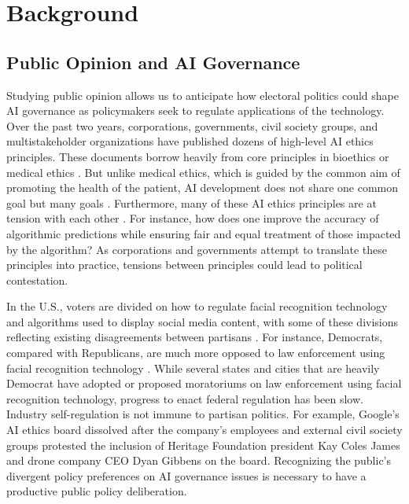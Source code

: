 \documentclass{article}
\begin{document}
\section{Background}

\subsection{Public Opinion and AI Governance}

Studying public opinion allows us to anticipate how electoral politics could shape AI governance as policymakers seek to regulate applications of the technology. Over the past two years, corporations, governments, civil society groups, and multistakeholder organizations have published dozens of high-level AI ethics principles. These documents borrow heavily from core principles in bioethics or medical ethics \citep{floridi2019unified}. But unlike medical ethics, which is guided by the common aim of promoting the health of the patient, AI development does not share one common goal but many goals \citep{mittelstadt2019ai}. Furthermore, many of these AI ethics principles are at tension with each other \citep{whittlestone2019role}. For instance, how does one improve the accuracy of algorithmic predictions while ensuring fair and equal treatment of those impacted by the algorithm? As corporations and governments attempt to translate these principles into practice, tensions between principles could lead to political contestation. 

In the U.S., voters are divided on how to regulate facial recognition technology and algorithms used to display social media content, with some of these divisions reflecting existing disagreements between partisans \citep{zhang2019regulation}. For instance, Democrats, compared with Republicans, are much more opposed to law enforcement using facial recognition technology \citep{smith2019facial}. While several states and cities that are heavily Democrat have adopted or proposed moratoriums on law enforcement using facial recognition technology, progress to enact federal regulation has been slow. Industry self-regulation is not immune to partisan politics. For example, Google's AI ethics board dissolved after the company's employees and external civil society groups protested the inclusion of Heritage Foundation president Kay Coles James and drone company CEO Dyan Gibbens on the board. Recognizing the public's divergent policy preferences on AI governance issues is necessary to have a productive public policy deliberation. 
\end{document}
